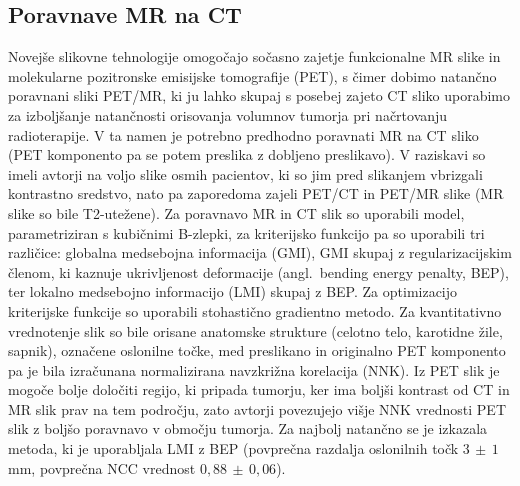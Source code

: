\documentclass[journal]{IEEEtran}
\begin{document}
\subsection{Poravnave MR na CT}

Novejše slikovne tehnologije omogočajo sočasno zajetje funkcionalne MR slike in molekularne pozitronske emisijske tomografije (PET), s čimer dobimo natančno poravnani sliki PET/MR, ki ju lahko skupaj s posebej zajeto CT sliko uporabimo za izboljšanje natančnosti orisovanja volumnov tumorja pri načrtovanju radioterapije. V ta namen je potrebno predhodno poravnati MR na CT sliko (PET komponento pa se potem preslika z dobljeno preslikavo). V raziskavi \cite{leibfarth2013} so imeli avtorji na voljo slike osmih pacientov, ki so jim pred slikanjem vbrizgali kontrastno sredstvo, nato pa zaporedoma zajeli PET/CT in PET/MR slike (MR slike so bile T2-utežene). Za poravnavo MR in CT slik so uporabili model, parametriziran s kubičnimi B-zlepki, za kriterijsko funkcijo pa so uporabili tri različice: globalna medsebojna informacija (GMI), GMI skupaj z regularizacijskim členom, ki kaznuje ukrivljenost deformacije (angl.~bending energy penalty, BEP), ter lokalno medsebojno informacijo (LMI) skupaj z BEP. Za optimizacijo kriterijske funkcije so uporabili stohastično gradientno metodo. Za kvantitativno vrednotenje slik so bile orisane anatomske strukture (celotno telo, karotidne žile, sapnik), označene oslonilne točke, med preslikano in originalno PET komponento pa je bila izračunana normalizirana navzkrižna korelacija (NNK). Iz PET slik je mogoče bolje določiti regijo, ki pripada tumorju, ker ima boljši kontrast od CT in MR slik prav na tem področju, zato avtorji povezujejo višje NNK vrednosti PET slik z boljšo poravnavo v območju tumorja. Za najbolj natančno se je izkazala metoda, ki je uporabljala LMI z BEP (povprečna razdalja oslonilnih točk $3\,\pm\,1$ mm, povprečna NCC vrednost $0{,}88\,\pm\,0{,}06$).
\end{document}
